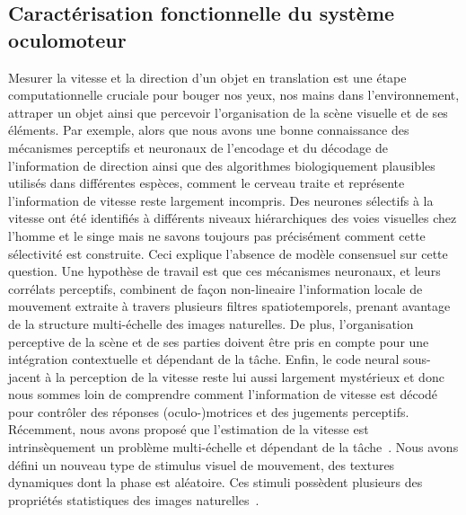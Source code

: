\documentclass[11pt,french,a4paper,oneside]{article}%
\begin{document}
\subsection{Caractérisation fonctionnelle du système oculomoteur~\citep{Sanz12,Simoncini12}}%
\label{sec:motionclouds}
Mesurer la vitesse et la direction d'un objet en translation est une étape computationnelle cruciale pour bouger nos yeux, nos mains dans l'environnement, attraper un objet ainsi que percevoir l'organisation de la scène visuelle et de ses éléments. Par exemple, alors que nous avons une bonne connaissance des mécanismes perceptifs et neuronaux de l'encodage et du décodage de l'information de direction ainsi que des algorithmes biologiquement plausibles utilisés dans différentes espèces, comment le cerveau traite et représente l'information de vitesse reste largement incompris. Des neurones sélectifs à la vitesse ont été identifiés à différents niveaux hiérarchiques des voies visuelles chez l'homme et le singe mais ne savons toujours pas précisément comment cette sélectivité est construite. Ceci explique l'absence de modèle consensuel sur cette question. Une hypothèse de travail est que ces mécanismes neuronaux, et leurs corrélats perceptifs, combinent de façon non-lineaire l'information locale de mouvement extraite à travers plusieurs filtres spatiotemporels, prenant avantage de la structure multi-échelle des images naturelles. De plus, l'organisation perceptive de la scène et de ses parties doivent être pris en compte pour une intégration contextuelle et dépendant de la tâche. Enfin, le code neural sous-jacent à la perception de la vitesse reste lui aussi largement mystérieux et donc nous sommes loin de comprendre comment l'information de vitesse est décodé pour contrôler des réponses (oculo-)motrices et des jugements perceptifs. Récemment, nous avons proposé que l'estimation de la vitesse est intrinsèquement un problème multi-échelle et dépendant de la tâche~\citep{Simoncini12}. Nous avons défini un nouveau type de stimulus visuel de mouvement, des textures dynamiques dont la phase est aléatoire. Ces stimuli possèdent plusieurs des propriétés statistiques des images naturelles~\citep{Sanz12,Vacher15nips}. 
\end{document}
